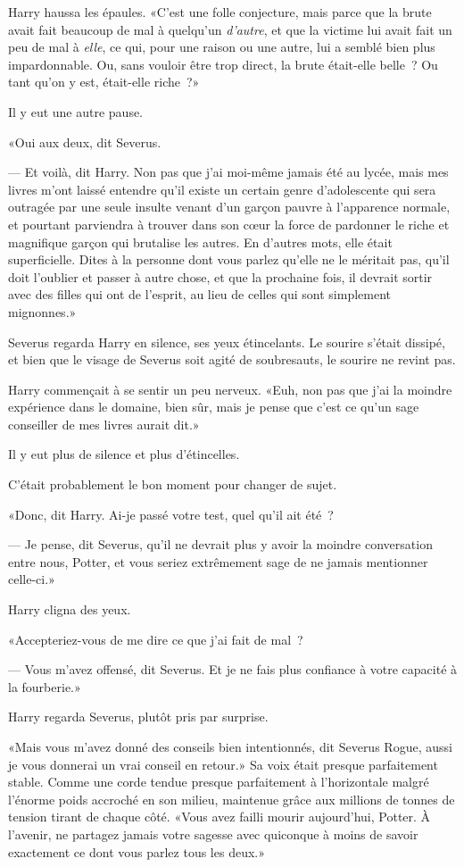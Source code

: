 Harry haussa les épaules. «C'est une folle conjecture, mais parce que la brute avait fait beaucoup de mal à quelqu'un \emph{d'autre}, et que la victime lui avait fait un peu de mal à \emph{elle}, ce qui, pour une raison ou une autre, lui a semblé bien plus impardonnable. Ou, sans vouloir être trop direct, la brute était-elle belle~? Ou tant qu'on y est, était-elle riche~?»

Il y eut une autre pause.

«Oui aux deux, dit Severus.

--- Et voilà, dit Harry. Non pas que j'ai moi-même jamais été au lycée, mais mes livres m'ont laissé entendre qu'il existe un certain genre d'adolescente qui sera outragée par une seule insulte venant d'un garçon pauvre à l'apparence normale, et pourtant parviendra à trouver dans son cœur la force de pardonner le riche et magnifique garçon qui brutalise les autres. En d'autres mots, elle était superficielle. Dites à la personne dont vous parlez qu'elle ne le méritait pas, qu'il doit l'oublier et passer à autre chose, et que la prochaine fois, il devrait sortir avec des filles qui ont de l'esprit, au lieu de celles qui sont simplement mignonnes.»

Severus regarda Harry en silence, ses yeux étincelants. Le sourire s'était dissipé, et bien que le visage de Severus soit agité de soubresauts, le sourire ne revint pas.

Harry commençait à se sentir un peu nerveux. «Euh, non pas que j'ai la moindre expérience dans le domaine, bien sûr, mais je pense que c'est ce qu'un sage conseiller de mes livres aurait dit.»

Il y eut plus de silence et plus d'étincelles.

C'était probablement le bon moment pour changer de sujet.

«Donc, dit Harry. Ai-je passé votre test, quel qu'il ait été~?

--- Je pense, dit Severus, qu'il ne devrait plus y avoir la moindre conversation entre nous, Potter, et vous seriez extrêmement sage de ne jamais mentionner celle-ci.»

Harry cligna des yeux.

«Accepteriez-vous de me dire ce que j'ai fait de mal~?

--- Vous m'avez offensé, dit Severus. Et je ne fais plus confiance à votre capacité à la fourberie.»

Harry regarda Severus, plutôt pris par surprise.

«Mais vous m'avez donné des conseils bien intentionnés, dit Severus Rogue, aussi je vous donnerai un vrai conseil en retour.» Sa voix était presque parfaitement stable. Comme une corde tendue presque parfaitement à l'horizontale malgré l'énorme poids accroché en son milieu, maintenue grâce aux millions de tonnes de tension tirant de chaque côté. «Vous avez failli mourir aujourd'hui, Potter. À l'avenir, ne partagez jamais votre sagesse avec quiconque à moins de savoir exactement ce dont vous parlez tous les deux.»

